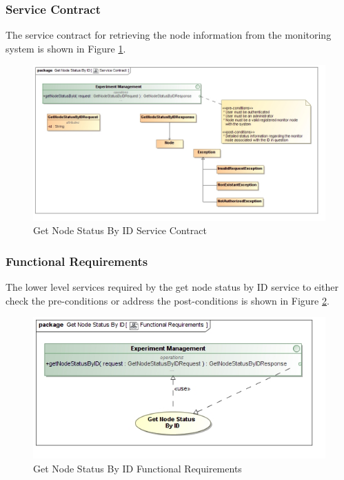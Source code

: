 \subsubsection{Service Contract}
The service contract for retrieving the node information from the monitoring system
is shown in Figure \ref{fig:getNodeStatusByIDServiceContract}.
\begin{figure}[H]
  \begin{center}
  \includegraphics[scale=0.38]{../Diagrams and Charts/Experiment/Get Node Status By ID Service Contract.jpg}
  \caption{Get Node Status By ID Service Contract}
  \label{fig:getNodeStatusByIDServiceContract}
  \end{center}
\end{figure}

\subsubsection {Functional Requirements}
The lower level services required by the get node status by ID service to 
either check the pre-conditions or address the post-conditions is shown in
Figure \ref{fig:getNodeStatusByIDFunctionalRequirements}.
\begin{figure}[H]
  \begin{center}
  \includegraphics[scale=0.38]{../Diagrams and Charts/Experiment/Get Node Status By ID Functional Requirements.jpg}
  \caption{Get Node Status By ID Functional Requirements}
  \label{fig:getNodeStatusByIDFunctionalRequirements}
  \end{center}
\end{figure}




